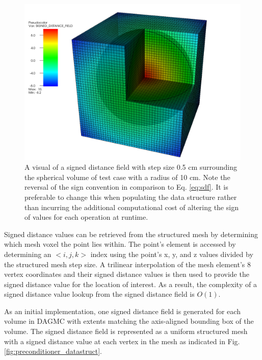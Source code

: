 \begin{figure}
  \begin{center}
  \includegraphics[scale=0.35]{../images/sdf_sphere.png}
  \caption{A visual of a signed distance field with step size 0.5 cm surrounding
    the spherical volume of test case with a radius of 10 cm. Note the reversal
    of the sign convention in comparison to Eq. \ref{eq:sdf}. It is preferable
    to change this when populating the data structure rather than incurring the
    additional computational cost of altering the sign of values for each
    operation at runtime.}
  \end{center}
  \label{fig:sdf_sphere}
\end{figure}

Signed distance values can be retrieved from the structured mesh by determining
which mesh voxel the point lies within. The point's element is accessed by
determining an $<i,j,k>$ index using the point's x, y, and z values divided by
the structured mesh step size. A trilinear interpolation of the mesh element's 8
vertex coordinates and their signed distance values is then used to provide the
signed distance value for the location of interest. As a result, the complexity
of a signed distance value lookup from the signed distance field is
$O(1)$.

As an initial implementation, one signed distance field is generated for each
volume in DAGMC with extents matching the axis-aligned bounding box of the
volume. The signed distance field is represented as a uniform structured mesh
with a signed distance value at each vertex in the mesh as indicated in Fig.
\ref{fig:preconditioner_datastruct}.

